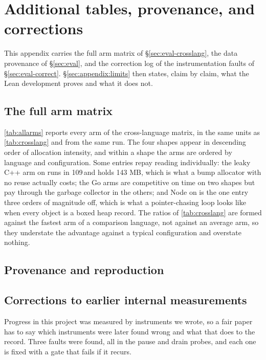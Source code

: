 \appendix
\section{Additional tables, provenance, and corrections}
\label{sec:appendix}

This appendix carries the full arm matrix of \S\ref{sec:eval-crosslang}, the data provenance of
\S\ref{sec:eval}, and the correction log of the instrumentation faults of
\S\ref{sec:eval-correct}.  \S\ref{sec:appendix:limits} then states, claim by claim, what the Lean
development proves and what it does not.

\subsection{The full arm matrix}
\label{sec:appendix:arms}

\tab\ref{tab:allarms} reports every arm of the cross-language matrix, in the same units as
\tab\ref{tab:crosslang} and from the same run.  The four shapes appear in descending order of
allocation intensity, and within a shape the arms are ordered by language and configuration.  Some
entries repay reading individually: the leaky C++ arm on  runs in 109\,\ms and holds
143 MB, which is what a bump allocator with no reuse actually costs; the Go arms are competitive on
time on two shapes but pay through the garbage collector in the others; and Node on  is
the one entry three orders of magnitude off, which is what a pointer-chasing loop looks like when
every object is a boxed heap record.  The ratios of \tab\ref{tab:crosslang} are formed against the
fastest arm of a comparison language, not against an average arm, so they understate the advantage
against a typical configuration and overstate nothing.



\subsection{Provenance and reproduction}
\label{sec:appendix:artifact}



\subsection{Corrections to earlier internal measurements}
\label{sec:appendix:corrections}

Progress in this project was measured by instruments we wrote, so a fair paper has to say which
instruments were later found wrong and what that does to the record.  Three faults were found, all
in the pause and drain probes, and each one is fixed with a gate that fails if it recurs.

